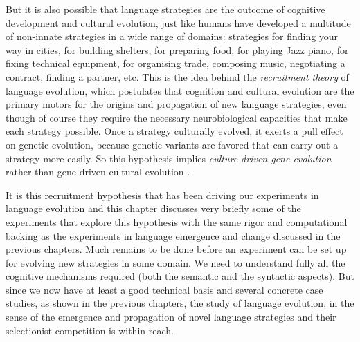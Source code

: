But it is also possible that language strategies are the outcome of cognitive development and cultural evolution, 
just like humans have developed a multitude of non-innate strategies in a wide range of domains: strategies for finding your 
way in cities, for building shelters, for preparing food, for playing Jazz piano, for fixing technical equipment, 
for organising trade, composing music, negotiating a contract, finding a partner, etc.  
This is the idea behind the {\itshape recruitment theory} of language evolution, which postulates that cognition and 
cultural evolution are the primary motors for the origins and propagation of new language strategies, even though of 
course they require the necessary neurobiological capacities that make each strategy possible. Once a strategy culturally 
evolved, it exerts a pull effect on genetic evolution, because genetic variants are favored that can carry out a strategy more easily. 
So this hypothesis implies {\itshape culture-driven gene evolution} rather than gene-driven cultural 
evolution \citep{Fisher:2013}. 

It is this recruitment hypothesis 
that has been driving our experiments in language evolution and this chapter discusses very briefly
some of the experiments that explore this hypothesis with the same rigor and computational backing as 
the experiments in language emergence and change discussed in the previous chapters. Much remains to be done
before an experiment can be set up for evolving new strategies in some domain. 
We need to understand fully all the cognitive mechanisms 
required (both the semantic and the syntactic aspects). 
But since we now have at least a good technical basis and several concrete
case studies, as shown in the previous chapters, the study of language evolution, in the sense of the emergence and 
propagation of novel language strategies and their selectionist competition is within reach. 

